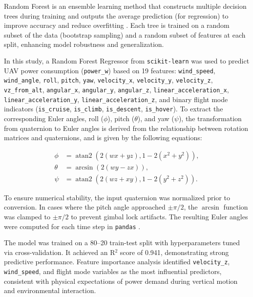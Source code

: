 Random Forest is an ensemble learning method that constructs multiple decision trees during training and outputs the average prediction (for regression) to improve accuracy and reduce overfitting \cite{gora2022}. Each tree is trained on a random subset of the data (bootstrap sampling) and a random subset of features at each split, enhancing model robustness and generalization.

In this study, a Random Forest Regressor from \texttt{scikit-learn} \cite{scikit} was used to predict UAV power consumption (\texttt{power\_w}) based on 19 features: \texttt{wind\_speed}, \texttt{wind\_angle}, \texttt{roll}, \texttt{pitch}, \texttt{yaw}, \texttt{velocity\_x}, \texttt{velocity\_y}, \texttt{velocity\_z}, \texttt{vz\_from\_alt}, \texttt{angular\_x}, \texttt{angular\_y}, \texttt{angular\_z}, \texttt{linear\_acceleration\_x}, \texttt{linear\_acceleration\_y}, \texttt{linear\_acceleration\_z}, and binary flight mode indicators (\texttt{is\_cruise}, \texttt{is\_climb}, \texttt{is\_descent}, \texttt{is\_hover}). 
To extract the corresponding Euler angles, roll ($\phi$), pitch ($\theta$), and yaw ($\psi$), the transformation from quaternion to Euler angles is derived from the relationship between rotation matrices and quaternions, and is given by the following equations:

\begin{align}
\phi &= \operatorname{atan2}(2(w x + y z), 1 - 2(x^2 + y^2)), \\
\theta &= \operatorname{arcsin}(2(w y - z x)), \\
\psi &= \operatorname{atan2}(2(w z + x y), 1 - 2(y^2 + z^2)).
\end{align}

To ensure numerical stability, the input quaternion was normalized prior to conversion. In cases where the pitch angle approached $\pm \pi/2$, the $\operatorname{arcsin}$ function was clamped to $\pm \pi/2$ to prevent gimbal lock artifacts. The resulting Euler angles were computed for each time step in \texttt{pandas} \cite{pandas}.

The model was trained on a 80–20 train-test split with hyperparameters tuned via cross-validation. It achieved an R$^2$ score of 0.941, demonstrating strong predictive performance. Feature importance analysis identified \texttt{velocity\_z}, \texttt{wind\_speed}, and flight mode variables as the most influential predictors, consistent with physical expectations of power demand during vertical motion and environmental interaction.

